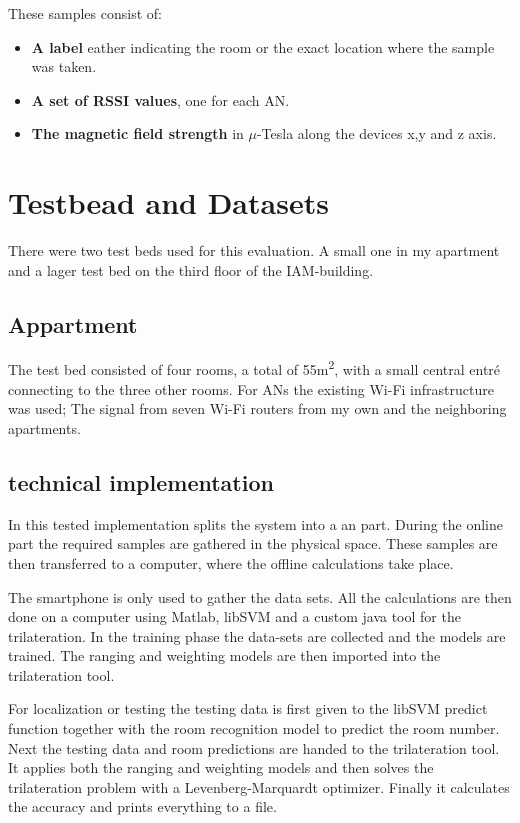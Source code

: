 These samples consist of:
\begin{itemize}
\item \textbf{A label} eather indicating the room or the exact location where the sample was taken.
\item \textbf{A set of RSSI values}, one for each AN.
\item \textbf{The magnetic field strength} in \(\mu\)-Tesla along the devices x,y and z axis.
\end{itemize}

\section{Testbead and Datasets}

There were two test beds used for this evaluation. A small one in my apartment and a lager test bed on the third floor of the IAM-building.

\subsection{Appartment}
The test bed consisted of four rooms, a total of 55m\textsuperscript{2}, with a small central entré connecting to the three other rooms. For ANs the existing Wi-Fi infrastructure was used; The signal from seven Wi-Fi routers from my own and the neighboring apartments. 

\subsection{technical implementation}
In this tested implementation splits the system into a  an  part. During the online part the required samples are gathered in the physical space. These samples are then transferred to a computer, where the offline calculations take place.

The smartphone is only used to gather the data sets. All the calculations are then done on a computer using Matlab, libSVM and a custom java tool for the trilateration. In the training phase the data-sets are collected and the models are trained. The ranging and weighting models are then imported into the trilateration tool.

For localization or testing the testing data is first given to the libSVM predict function together with the room recognition model to predict the room number. Next the testing data and room predictions are handed to the trilateration tool. It applies both the ranging and weighting models and then solves the trilateration problem with a Levenberg-Marquardt optimizer. Finally it calculates the accuracy and prints everything to a file.

